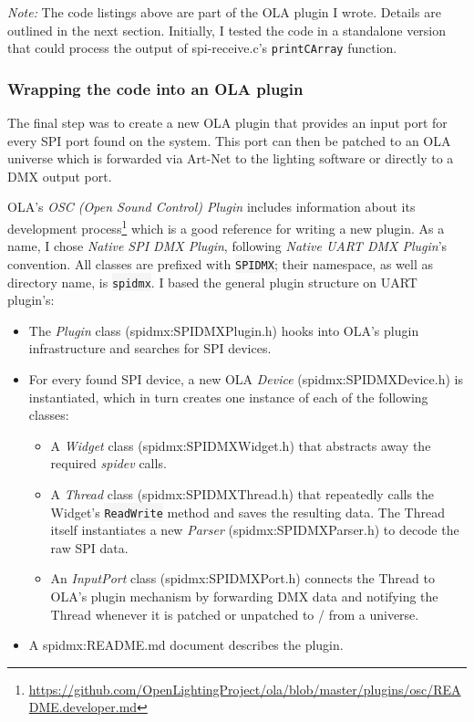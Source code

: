 \emph{Note:} The code listings above are part of the OLA plugin I wrote.
Details are outlined in the next section. Initially, I tested the code
in a standalone version that could process the output of
\gls{spi-receive.c}'s \colorbox{WhiteSmoke}{\lstinline!printCArray!}
function.

\subsubsection{Wrapping the code into an OLA
plugin}\label{sec:spidmx-wrapping}

The final step was to create a new OLA plugin that provides an input
port for every SPI port found on the system. This port can then be
patched to an OLA universe which is forwarded via Art-Net to the
lighting software or directly to a DMX output port.

OLA's \emph{OSC (Open Sound Control) Plugin} includes information about
its development process\footnote{\url{https://github.com/OpenLightingProject/ola/blob/master/plugins/osc/README.developer.md}}
which is a good reference for writing a new plugin. As a name, I chose
\emph{Native SPI DMX Plugin}, following \emph{Native UART DMX Plugin}'s
convention. All classes are prefixed with \colorbox{WhiteSmoke}{\lstinline!SPIDMX!}; their
namespace, as well as directory name, is \colorbox{WhiteSmoke}{\lstinline!spidmx!}. I based the
general plugin structure on UART plugin's:

\begin{itemize}
\tightlist
\item
  The \emph{Plugin} class (\gls{spidmx:SPIDMXPlugin.h}) hooks into OLA's
  plugin infrastructure and searches for SPI devices.
\item
  For every found SPI device, a new OLA \emph{Device}
  (\gls{spidmx:SPIDMXDevice.h}) is instantiated, which in turn creates
  one instance of each of the following classes:

  \begin{itemize}
  \tightlist
  \item
    A \emph{Widget} class (\gls{spidmx:SPIDMXWidget.h}) that abstracts
    away the required \emph{spidev} calls.
  \item
    A \emph{Thread} class (\gls{spidmx:SPIDMXThread.h}) that repeatedly
    calls the Widget's \colorbox{WhiteSmoke}{\lstinline!ReadWrite!} method and saves the
    resulting data. The Thread itself instantiates a new \emph{Parser}
    (\gls{spidmx:SPIDMXParser.h}) to decode the raw SPI data.
  \item
    An \emph{InputPort} class (\gls{spidmx:SPIDMXPort.h}) connects the
    Thread to OLA's plugin mechanism by forwarding DMX data and
    notifying the Thread whenever it is patched or unpatched to / from a
    universe.
  \end{itemize}
\item
  A \gls{spidmx:README.md} document describes the plugin.
\end{itemize}

